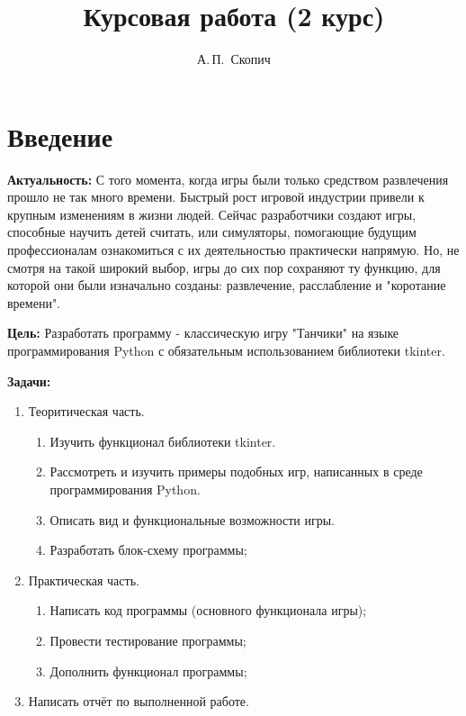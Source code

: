 \documentclass[14pt, oneside]{altsu-report}
\title{Курсовая работа (2 курс)}
\author{А.\,П.~Скопич}
\institute{Институт цифровых технологий, электроники и физики}
\date{\the\year}
\begin{document}
\maketitle

\setcounter{page}{2}
\makeabstract
\tableofcontents

\chapter*{Введение}

\textbf{Актуальность: }
С того момента, когда игры были только средством развлечения прошло не так много времени. Быстрый рост игровой индустрии привели к крупным изменениям в жизни людей. Сейчас разработчики создают игры, способные научить детей считать, или симуляторы, помогающие будущим профессионалам ознакомиться с их деятельностью практически напрямую. Но, не смотря на такой широкий выбор, игры до сих пор сохраняют ту функцию, для которой они были изначально созданы: развлечение, расслабление и "коротание времени".

\textbf{Цель: }
Разработать программу - классическую игру "Танчики" на языке программирования Python с обязательным использованием библиотеки tkinter.

\textbf{Задачи:}
\begin{enumerate}
\item Теоритическая часть.
\begin{enumerate}
    \item Изучить функционал библиотеки tkinter.
    \item Рассмотреть и изучить примеры подобных игр, написанных в среде программирования Python.
    \item Описать вид и функциональные возможности игры.
    \item Разработать блок-схему программы;
\end{enumerate}
\item Практическая часть.
\begin{enumerate}
    \item Написать код программы (основного функционала игры);
    \item Провести тестирование программы;
    \item Дополнить функционал программы;
\end{enumerate}
\item Написать отчёт по выполненной работе.
\end{enumerate}
\end{document}
